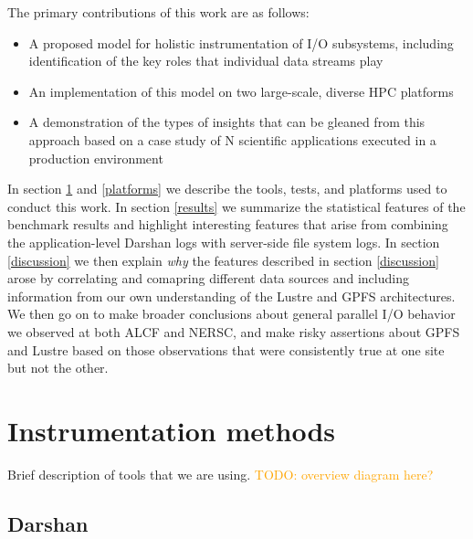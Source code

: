 \documentclass[conference,10pt,compsocconf]{IEEEtran}
\newcommand{\todo}[1]{\textcolor{Orange}{TODO: #1}}
\begin{document}

The primary contributions of this work are as follows:

\begin{itemize}
\item A proposed model for holistic instrumentation of I/O subsystems,
including identification of the key roles that individual data streams play
\item An implementation of this model on two large-scale, diverse HPC
platforms
\item A demonstration of the types of insights that can be gleaned from this
approach based on a case study of N scientific applications executed in a
production environment
\end{itemize}

In section \ref{methods} and \ref{platforms} we describe the tools, tests, and
platforms used to conduct this work.  In section \ref{results} we summarize the
statistical features of the benchmark results and highlight interesting features
that arise from combining the application-level Darshan logs with server-side
file system logs.  In section \ref{discussion} we then explain \emph{why} the
features described in section \ref{discussion} arose by correlating and
comapring different data sources and including information from our own
understanding of the Lustre and GPFS architectures.  We then go on to make
broader conclusions about general parallel I/O behavior we observed at both
ALCF and NERSC, and make risky assertions about GPFS and Lustre based on those
observations that were consistently true at one site but not the other.

\section{Instrumentation methods} \label{methods}

Brief description of tools that we are using.
\todo{overview diagram here?}

\subsection{Darshan}
\end{document}
